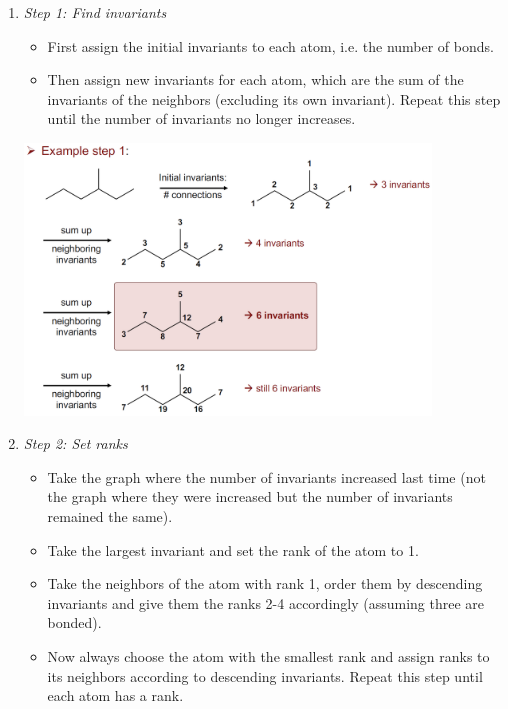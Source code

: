 \begin{enumerate}
    \item \emph{Step 1: Find invariants}
    \begin{itemize}
        \item First assign the initial invariants to each atom, i.e. the number of bonds.
        \item Then assign new invariants for each atom, which are the sum of the invariants of the neighbors (excluding its own invariant). Repeat this step until the number of invariants no longer increases.
    \end{itemize}
    \begin{center}\includegraphics[width=0.85\textwidth]{img/cheminformatics/Morgan1.png}\end{center}
    \item \emph{Step 2: Set ranks}
    \begin{itemize}
        \item Take the graph where the number of invariants increased last time (not the graph where they were increased but the number of invariants remained the same).
        \item Take the largest invariant and set the rank of the atom to 1.
        \item Take the neighbors of the atom with rank 1, order them by descending invariants and give them the ranks 2-4 accordingly (assuming three are bonded).
        \item Now always choose the atom with the smallest rank and assign ranks to its neighbors according to descending invariants. Repeat this step until each atom has a rank.
    \end{itemize}

\end{enumerate}

